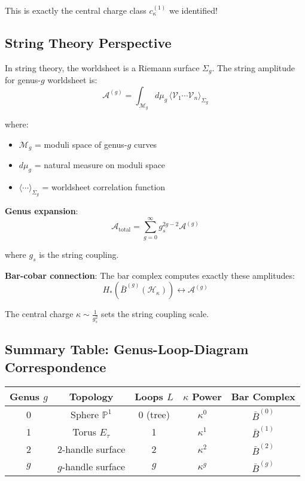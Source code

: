 This is exactly the central charge class $c_\kappa^{(1)}$ we identified!

\subsection{String Theory Perspective}

In string theory, the worldsheet is a Riemann surface $\Sigma_g$. The string amplitude for genus-$g$ worldsheet is:
\begin{equation}
\mathcal{A}^{(g)} = \int_{\mathcal{M}_g} d\mu_g \, \langle \mathcal{V}_1 \cdots \mathcal{V}_n \rangle_{\Sigma_g}
\end{equation}

where:
\begin{itemize}
\item $\mathcal{M}_g$ = moduli space of genus-$g$ curves
\item $d\mu_g$ = natural measure on moduli space
\item $\langle \cdots \rangle_{\Sigma_g}$ = worldsheet correlation function
\end{itemize}

\textbf{Genus expansion}:
\begin{equation}
\mathcal{A}_{\text{total}} = \sum_{g=0}^\infty g_s^{2g-2} \mathcal{A}^{(g)}
\end{equation}

where $g_s$ is the string coupling.

\textbf{Bar-cobar connection}: The bar complex computes exactly these amplitudes:
\begin{equation}
H_*(\bar{B}^{(g)}(\mathcal{H}_\kappa)) \leftrightarrow \mathcal{A}^{(g)}
\end{equation}

The central charge $\kappa \sim \frac{1}{g_s^2}$ sets the string coupling scale.

\subsection{Summary Table: Genus-Loop-Diagram Correspondence}

\begin{center}
\begin{tabular}{|c|c|c|c|c|}
\hline
\textbf{Genus $g$} & \textbf{Topology} & \textbf{Loops $L$} & \textbf{$\kappa$ Power} & \textbf{Bar Complex}\\
\hline
0 & Sphere $\mathbb{P}^1$ & 0 (tree) & $\kappa^0$ & $\bar{B}^{(0)}$\\
\hline
1 & Torus $E_\tau$ & 1 & $\kappa^1$ & $\bar{B}^{(1)}$\\
\hline
2 & 2-handle surface & 2 & $\kappa^2$ & $\bar{B}^{(2)}$\\
\hline
$g$ & $g$-handle surface & $g$ & $\kappa^g$ & $\bar{B}^{(g)}$\\
\hline
\end{tabular}
\end{center}


